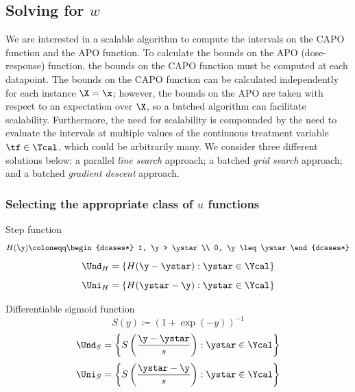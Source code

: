 \subsection{Solving for $w$}
\label{sec:algorithm}
We are interested in a scalable algorithm to compute the intervals on the CAPO function and the APO function.
To calculate the bounds on the APO (dose-response) function, the bounds on  the CAPO function must be computed at each datapoint.
The bounds on the CAPO function can be calculated independently for each instance $\X=\x$; however, the bounds on the APO are taken with respect to an expectation over $\X$, so a batched algorithm can facilitate scalability.
Furthermore, the need for scalability is compounded by the need to evaluate the intervals at multiple values of the continuous treatment variable $\tf \in \Tcal$, which could be arbitrarily many.
We consider three different solutions below: a parallel \emph{line search} approach; a batched \emph{grid search} approach; and a batched \emph{gradient descent} approach.
\subsubsection{Selecting the appropriate class of $u$ functions}
Step function
\begin{equation*}
    H(\y) \coloneqq 
    \begin{dcases*}
        1, \y > \ystar \\
        0, \y \leq \ystar
    \end{dcases*}
\end{equation*}
\begin{equation*}
    \Und_H = \left\{ H(\y - \ystar): \ystar \in \Ycal \right\}
\end{equation*}
\begin{equation*}
    \Uni_H = \left\{ H(\ystar - \y): \ystar \in \Ycal \right\}
\end{equation*}

Differentiable sigmoid function
\begin{equation*}
    S(y) \coloneqq \left( 1 + \exp{(-y)} \right)^{-1}
\end{equation*}
\begin{equation*}
    \Und_S = \left\{ S\left(\frac{\y - \ystar}{s}\right): \ystar \in \Ycal \right\}
\end{equation*}
\begin{equation*}
    \Uni_S = \left\{ S\left(\frac{\ystar - \y}{s}\right): \ystar \in \Ycal \right\}
\end{equation*}

